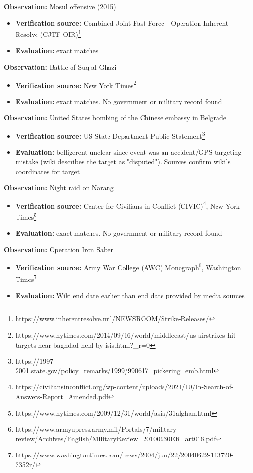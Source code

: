 \documentclass[fleqn,12pt]{article}
\begin{document}
\textbf{Observation:} Mosul offensive (2015)
\begin{itemize}
    \item \textbf{Verification source:} Combined Joint Fast Force - Operation Inherent Resolve (CJTF-OIR)\footnote{https://www.inherentresolve.mil/NEWSROOM/Strike-Releases/}
    \item \textbf{Evaluation:} exact matches
\end{itemize}

\textbf{Observation:} Battle of Suq al Ghazi
\begin{itemize}
    \item \textbf{Verification source:} New York Times\footnote{https://www.nytimes.com/2014/09/16/world/middleeast/us-airstrikes-hit-targets-near-baghdad-held-by-isis.html?_r=0}
    \item \textbf{Evaluation:} exact matches. No government or military record found
\end{itemize}

\textbf{Observation:} United States bombing of the Chinese embassy in Belgrade
\begin{itemize}
    \item \textbf{Verification source:} US State Department Public Statement\footnote{https://1997-2001.state.gov/policy_remarks/1999/990617_pickering_emb.html}
    \item \textbf{Evaluation:} belligerent unclear since event was an accident/GPS targeting mistake (wiki describes the target as "disputed"). Sources confirm wiki's coordinates for target
\end{itemize}

\textbf{Observation:} Night raid on Narang
\begin{itemize}
    \item \textbf{Verification source:} Center for Civilians in Conflict (CIVIC)\footnote{https://civiliansinconflict.org/wp-content/uploads/2021/10/In-Search-of-Answers-Report_Amended.pdf}, New York Times\footnote{https://www.nytimes.com/2009/12/31/world/asia/31afghan.html}
    \item \textbf{Evaluation:} exact matches. No government or military record found
\end{itemize}

\textbf{Observation:} Operation Iron Saber
\begin{itemize}
    \item \textbf{Verification source:} Army War College (AWC) Monograph\footnote{https://www.armyupress.army.mil/Portals/7/military-review/Archives/English/MilitaryReview_20100930ER_art016.pdf}, Washington Times\footnote{https://www.washingtontimes.com/news/2004/jun/22/20040622-113720-3352r/}
    \item \textbf{Evaluation:} Wiki end date earlier than end date provided by media sources
\end{itemize}
\end{document}
